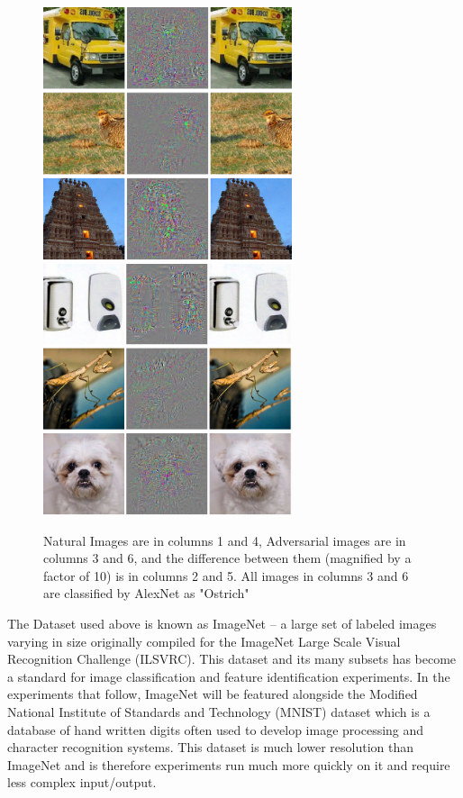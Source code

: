 \begin{figure}[t]
   \centering
\includegraphics[width=7.3cm]{negative1.png}\includegraphics[width=7.3cm]{negative2.png}
   \caption{Natural Images are in columns 1 and 4, Adversarial images are in columns 3 and 6, and the difference between them (magnified by a factor of 10) is in columns 2 and 5. All images in columns 3 and 6 are classified by AlexNet as "Ostrich" \cite{szegedy2013}}
   \label{fig:my_label}
\end{figure}



The Dataset used above is known as ImageNet -- a large set of labeled images varying in size originally compiled for the ImageNet Large Scale Visual Recognition Challenge (ILSVRC). This dataset and its many subsets has become a standard for image classification and feature identification experiments. In the experiments that follow, ImageNet will be featured alongside the Modified National Institute of Standards and Technology (MNIST) dataset which is a database of hand written digits often used to develop image processing and character recognition systems. This dataset is much lower resolution than ImageNet and is therefore experiments run much more quickly on it and require less complex input/output.  




